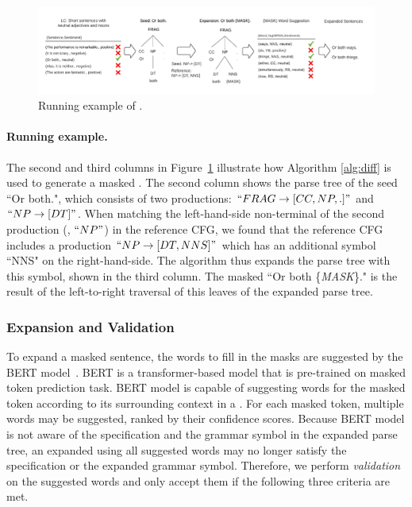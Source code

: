 \begin{figure}[t]
  \centering
  \includegraphics[scale=0.5]{figs/running_example.pdf}
  \vspace{-8mm}
  \caption{Running example of \tool.}
  \label{fig:ExpEx}
\end{figure}

\paragraph*{Running example.} The second and third columns in Figure~\ref{fig:ExpEx} illustrate how Algorithm \ref{alg:diff} is used to generate a masked \sent. The second column shows the parse tree of the seed \sent ``Or both.", which consists of two productions: $``FRAG\rightarrow[CC, NP, .]"$ and $``NP\rightarrow[DT]"$.
When matching the left-hand-side non-terminal of the second production
(\ie, $``NP"$) in the reference CFG, we found that the reference CFG includes a
production $``NP\rightarrow[DT, NNS]"$ which has an additional symbol ``NNS" on
the right-hand-side. The algorithm thus expands the parse tree with
this symbol, shown in the third column.  The masked \sent ``Or both
\{\emph{MASK}\}." is the result of the left-to-right traversal of this leaves of the
expanded parse tree.

\subsubsection{\Sent Expansion and Validation}
\label{sec:approach:syntaxexpnvalidation}
To expand a masked sentence, the words to fill in the masks are
suggested by the BERT model~\cite{devlin2019bert}.
BERT is a transformer-based \nl model that is pre-trained on masked token prediction task. BERT model is capable of suggesting words for the masked
token according to its surrounding context in a \sent. For each masked
token, multiple words may be suggested, ranked by their confidence scores.
Because BERT model is not aware of the \lc
specification and the grammar symbol in the expanded parse tree, an
expanded \sent using all suggested words may no longer satisfy the
\lc specification or the expanded grammar symbol. Therefore, we perform \emph{validation}
on the suggested words and only accept them if the following three
criteria are met.

